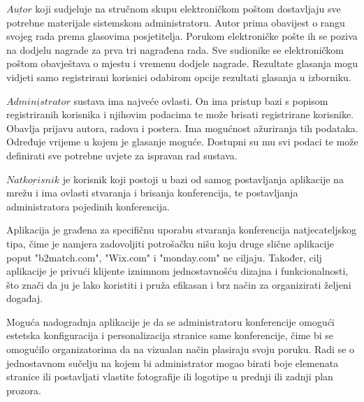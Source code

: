 		$\underline{Autor}$ koji sudjeluje na stručnom skupu elektroničkom poštom dostavljaju sve potrebne materijale sistemskom administratoru. Autor prima obavijest o rangu svojeg rada prema glasovima posjetitelja. Porukom elektroničke pošte ih se poziva na dodjelu nagrade za prva tri nagrađena rada. Sve sudionike se elektroničkom poštom obavještava o mjestu i vremenu dodjele nagrade. Rezultate glasanja mogu vidjeti samo registrirani korisnici odabirom opcije rezultati glasanja u izborniku.
		
		$\underline{Administrator}$ sustava ima najveće ovlasti. On ima pristup bazi s popisom registriranih korisnika i njihovim podacima te može brisati registrirane korisnike. Obavlja prijavu autora, radova i postera. Ima mogućnost ažuriranja tih podataka. Određuje vrijeme u kojem je glasanje moguće. Dostupni su mu svi podaci te može definirati sve potrebne uvjete za ispravan rad sustava.
		
		$\underline{Natkorisnik}$ je korisnik koji postoji u bazi od samog postavljanja aplikacije na mrežu i ima ovlasti stvaranja i brisanja konferencija, te postavljanja administratora pojedinih konferencija.
		
		Aplikacija je građena za specifičnu uporabu stvaranja konferencija natjecateljskog tipa, čime je namjera zadovoljiti potrošačku nišu koju druge slične aplikacije poput "b2match.com", "Wix.com" i "monday.com" ne ciljaju. Također, cilj aplikacije je privući klijente iznimnom jednostavnošću dizajna i funkcionalnosti, što znači da ju je lako koristiti i pruža efikasan i brz način za organizirati željeni događaj.
		
		Moguća nadogradnja aplikacije je da se administratoru konferencije omogući estetska konfiguracija i personalizacija stranice same konferencije, čime bi se omogućilo organizatorima da na vizualan način plasiraju svoju poruku. Radi se o jednostavnom sučelju na kojem bi administrator mogao birati boje elemenata stranice ili postavljati vlastite fotografije ili logotipe u prednji ili zadnji plan prozora.

		\eject
		
